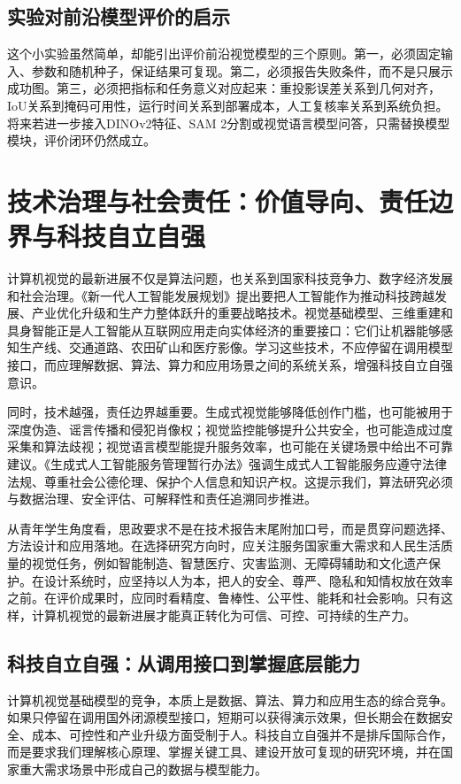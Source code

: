 \documentclass[UTF8,a4paper,12pt]{ctexart}
\newcommand{\model}[1]{\textsf{#1}}
\begin{document}
\subsection{实验对前沿模型评价的启示}
这个小实验虽然简单，却能引出评价前沿视觉模型的三个原则。第一，必须固定输入、参数和随机种子，保证结果可复现。第二，必须报告失败条件，而不是只展示成功图。第三，必须把指标和任务意义对应起来：重投影误差关系到几何对齐，IoU关系到掩码可用性，运行时间关系到部署成本，人工复核率关系到系统负担。将来若进一步接入\model{DINOv2}特征、\model{SAM 2}分割或视觉语言模型问答，只需替换模型模块，评价闭环仍然成立。

\section{技术治理与社会责任：价值导向、责任边界与科技自立自强}
计算机视觉的最新进展不仅是算法问题，也关系到国家科技竞争力、数字经济发展和社会治理。《新一代人工智能发展规划》提出要把人工智能作为推动科技跨越发展、产业优化升级和生产力整体跃升的重要战略技术\cite{aiplan}。视觉基础模型、三维重建和具身智能正是人工智能从互联网应用走向实体经济的重要接口：它们让机器能够感知生产线、交通道路、农田矿山和医疗影像。学习这些技术，不应停留在调用模型接口，而应理解数据、算法、算力和应用场景之间的系统关系，增强科技自立自强意识。

同时，技术越强，责任边界越重要。生成式视觉能够降低创作门槛，也可能被用于深度伪造、谣言传播和侵犯肖像权；视觉监控能够提升公共安全，也可能造成过度采集和算法歧视；视觉语言模型能提升服务效率，也可能在关键场景中给出不可靠建议。《生成式人工智能服务管理暂行办法》强调生成式人工智能服务应遵守法律法规、尊重社会公德伦理、保护个人信息和知识产权\cite{genai2023}。这提示我们，算法研究必须与数据治理、安全评估、可解释性和责任追溯同步推进。

从青年学生角度看，思政要求不是在技术报告末尾附加口号，而是贯穿问题选择、方法设计和应用落地。在选择研究方向时，应关注服务国家重大需求和人民生活质量的视觉任务，例如智能制造、智慧医疗、灾害监测、无障碍辅助和文化遗产保护。在设计系统时，应坚持以人为本，把人的安全、尊严、隐私和知情权放在效率之前。在评价成果时，应同时看精度、鲁棒性、公平性、能耗和社会影响。只有这样，计算机视觉的最新进展才能真正转化为可信、可控、可持续的生产力。

\subsection{科技自立自强：从调用接口到掌握底层能力}
计算机视觉基础模型的竞争，本质上是数据、算法、算力和应用生态的综合竞争。如果只停留在调用国外闭源模型接口，短期可以获得演示效果，但长期会在数据安全、成本、可控性和产业升级方面受制于人。科技自立自强并不是排斥国际合作，而是要求我们理解核心原理、掌握关键工具、建设开放可复现的研究环境，并在国家重大需求场景中形成自己的数据与模型能力。
\end{document}
